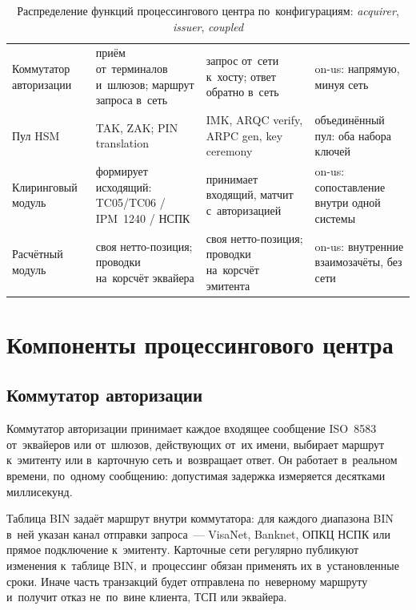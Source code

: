 \begin{table}[tbp]
  \caption{Распределение функций процессингового центра
  по~конфигурациям: \textit{acquirer}, \textit{issuer}, \textit{coupled}}\label{tab:processor-configurations}
  \begingroup
  \tablesetup
  \begin{tabularx}{\textwidth}{@{}B{0.19\textwidth} Y Y Y@{}}
    \toprule
    \headrow
     &  &  &  \\
    \midrule
    Коммутатор авторизации & приём от~терминалов и~шлюзов; маршрут запроса в~сеть &
    запрос от~сети к~хосту; ответ обратно в~сеть & on-us: напрямую, минуя сеть \\
    \rowsep
    Пул HSM & TAK, ZAK; PIN translation & IMK, ARQC verify, ARPC gen, key ceremony &
    объединённый пул: оба набора ключей \\
    \rowsep
    Клиринговый модуль & формирует исходящий: TC05/TC06 / IPM~1240 / НСПК &
    принимает входящий, матчит с~авторизацией & on-us: сопоставление внутри одной системы \\
    \rowsep
    Расчётный модуль & своя нетто-позиция; проводки на~корсчёт эквайера &
    своя нетто-позиция; проводки на~корсчёт эмитента & on-us: внутренние взаимозачёты, без сети \\
    \bottomrule
  \end{tabularx}\par
  \endgroup
\end{table}

\section{Компоненты процессингового центра}\label{sec:pc-components}

\subsection*{Коммутатор авторизации}

Коммутатор авторизации принимает каждое входящее сообщение ISO~8583
от~эквайеров или от~шлюзов, действующих от~их имени, выбирает маршрут
к~эмитенту или в~карточную сеть и~возвращает ответ. Он работает в~реальном
времени, по~одному сообщению: допустимая задержка измеряется десятками
миллисекунд.~\cite{visa-core-rules,mc-tpr}

Таблица BIN задаёт маршрут внутри коммутатора: для каждого диапазона BIN в~ней
указан канал отправки запроса~--- VisaNet, Banknet, ОПКЦ НСПК или прямое
подключение к~эмитенту. Карточные сети регулярно публикуют изменения
к~таблице BIN, и~процессинг обязан применять их в~установленные сроки. Иначе
часть транзакций будет отправлена по~неверному маршруту и~получит отказ
не~по~вине клиента, ТСП или эквайера.~\cite{visa-core-rules,mc-rules}

